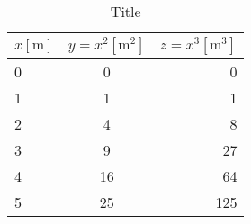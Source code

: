 \begin{table}[h]
\centering
\caption{Title}
\begin{tabular}{| l | c | r |}\hline
$x[\mathrm{m}]$	&	$y=x^2[\mathrm{m^2}]$	&	$z=x^3[\mathrm{m^3}]	$\\\hline
0	&	0	&	0	\\\hline
1	&	1	&	1	\\\hline
2	&	4	&	8	\\\hline
3	&	9	&	27	\\\hline
4	&	16	&	64	\\\hline
5	&	25	&	125	\\\hline
\end{tabular}
\end{table}